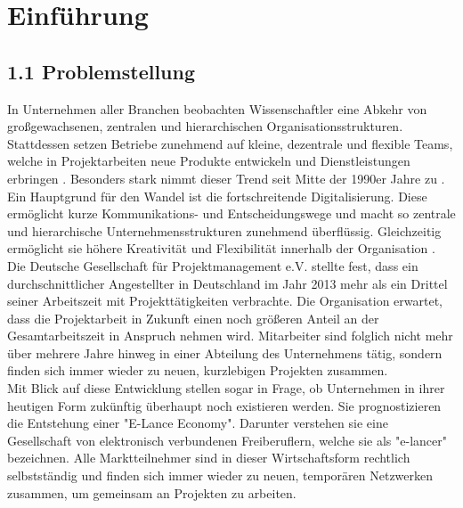 \chapter{Einführung}
\label{ch:intro}

\section[Problemstellung]{1.1 Problemstellung}
\label{sec:intro:motivation}
In Unternehmen aller Branchen beobachten Wissenschaftler eine Abkehr von großgewachsenen, zentralen und hierarchischen Organisationsstrukturen. Stattdessen setzen Betriebe zunehmend auf kleine, dezentrale und flexible Teams, welche in Projektarbeiten neue Produkte entwickeln und Dienstleistungen erbringen \cite[S. 15]{elanceEconomy:1999}. Besonders stark nimmt dieser Trend seit Mitte der 1990er Jahre zu \cite[S. 8]{whittington:1999}. Ein Hauptgrund für den Wandel ist die fortschreitende Digitalisierung. Diese ermöglicht kurze Kommunikations- und Entscheidungswege und macht so zentrale und hierarchische Unternehmensstrukturen zunehmend überflüssig. Gleichzeitig ermöglicht sie höhere Kreativität und Flexibilität innerhalb der Organisation \cite[S. 17]{elanceEconomy:1999}.\\
Die Deutsche Gesellschaft für Projektmanagement e.V. \cite[S. 16]{gpm:2015} stellte fest, dass ein durchschnittlicher Angestellter in Deutschland im Jahr 2013 mehr als ein Drittel seiner Arbeitszeit mit Projekttätigkeiten verbrachte. Die Organisation erwartet, dass die Projektarbeit in Zukunft einen noch größeren Anteil an der Gesamtarbeitszeit in Anspruch nehmen wird. Mitarbeiter sind folglich nicht mehr über mehrere Jahre hinweg in einer Abteilung des Unternehmens tätig, sondern finden sich immer wieder zu neuen, kurzlebigen Projekten zusammen.\\
Mit Blick auf diese Entwicklung stellen \textcite[S. 14]{elanceEconomy:1999} sogar in Frage, ob Unternehmen in ihrer heutigen Form zukünftig überhaupt noch existieren werden. Sie prognostizieren die Entstehung einer "E-Lance Economy". Darunter verstehen sie eine Gesellschaft von elektronisch verbundenen Freiberuflern, welche sie als "e-lancer" bezeichnen. Alle Marktteilnehmer sind in dieser Wirtschaftsform rechtlich selbstständig und finden sich immer wieder zu neuen, temporären Netzwerken zusammen, um gemeinsam an Projekten zu arbeiten.\\
